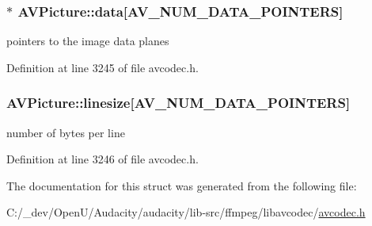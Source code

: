 \subsubsection[{\texorpdfstring{data}{data}}]{$\ast$ A\+V\+Picture\+::data\mbox{[}{\bf A\+V\+\_\+\+N\+U\+M\+\_\+\+D\+A\+T\+A\+\_\+\+P\+O\+I\+N\+T\+E\+RS}\mbox{]}}\hypertarget{struct_a_v_picture_a7d4879fa3ea09329981c9bdf4d5e077c}{}\label{struct_a_v_picture_a7d4879fa3ea09329981c9bdf4d5e077c}


pointers to the image data planes 



Definition at line 3245 of file avcodec.\+h.

\subsubsection[{\texorpdfstring{linesize}{linesize}}]{ A\+V\+Picture\+::linesize\mbox{[}{\bf A\+V\+\_\+\+N\+U\+M\+\_\+\+D\+A\+T\+A\+\_\+\+P\+O\+I\+N\+T\+E\+RS}\mbox{]}}\hypertarget{struct_a_v_picture_a51b07f91c0ca87b6b4b63f298c8ce34c}{}\label{struct_a_v_picture_a51b07f91c0ca87b6b4b63f298c8ce34c}


number of bytes per line 



Definition at line 3246 of file avcodec.\+h.



The documentation for this struct was generated from the following file\+:\begin{DoxyCompactItemize}
\item 
C\+:/\+\_\+dev/\+Open\+U/\+Audacity/audacity/lib-\/src/ffmpeg/libavcodec/\hyperlink{avcodec_8h}{avcodec.\+h}\end{DoxyCompactItemize}
